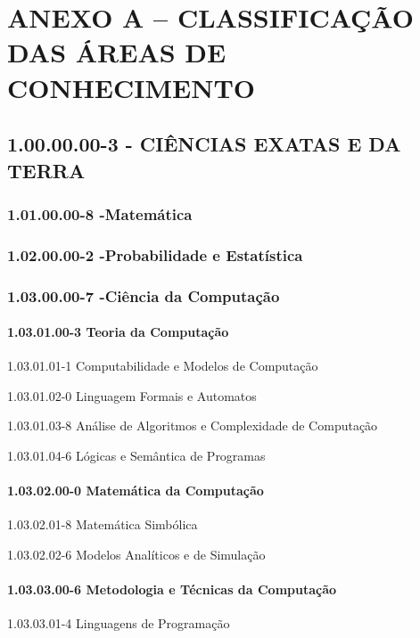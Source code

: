 \chapter*{ANEXO A --  CLASSIFICAÇÃO DAS ÁREAS DE CONHECIMENTO }

\section*{1.00.00.00-3 - CIÊNCIAS EXATAS E DA TERRA} 

\subsection*{1.01.00.00-8 -Matemática}

\subsection*{1.02.00.00-2 -Probabilidade e Estatística}

\subsection*{1.03.00.00-7 -Ciência da Computação}

\subsubsection*{1.03.01.00-3 Teoria da Computação}

1.03.01.01-1 Computabilidade e Modelos de Computação

1.03.01.02-0 Linguagem Formais e Automatos

1.03.01.03-8 Análise de Algoritmos e Complexidade de Computação

1.03.01.04-6 Lógicas e Semântica de Programas

\subsubsection*{1.03.02.00-0 Matemática da Computação}

1.03.02.01-8 Matemática Simbólica

1.03.02.02-6 Modelos Analíticos e de Simulação

\subsubsection*{1.03.03.00-6 Metodologia e Técnicas da Computação}

1.03.03.01-4 Linguagens de Programação

